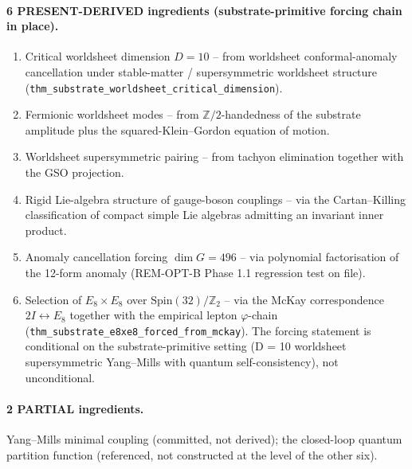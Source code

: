 ﻿\documentclass[reprint,amsmath,amssymb,aps,prd,longbibliography,floatfix]{revtex4-2}
\begin{document}
\paragraph{6 PRESENT-DERIVED ingredients (substrate-primitive forcing
chain in place).}
\begin{enumerate}
\item Critical worldsheet dimension $D = 10$ -- from worldsheet
conformal-anomaly cancellation under stable-matter / supersymmetric
worldsheet structure
(\texttt{thm\_substrate\_worldsheet\_critical\_dimension}).
\item Fermionic worldsheet modes -- from $\mathbb{Z}/2$-handedness
of the substrate amplitude plus the squared-Klein--Gordon equation
of motion.
\item Worldsheet supersymmetric pairing -- from tachyon elimination
together with the GSO projection.
\item Rigid Lie-algebra structure of gauge-boson couplings -- via the
Cartan--Killing classification of compact simple Lie algebras
admitting an invariant inner product.
\item[\hspace{0pt}\textbf{7.}] Anomaly cancellation forcing
$\dim G = 496$ -- via polynomial factorisation of the 12-form anomaly
(REM-OPT-B Phase 1.1 regression test on file).
\item[\hspace{0pt}\textbf{10.}] Selection of $E_8 \times E_8$ over
$\mathrm{Spin}(32)/\mathbb{Z}_2$ -- via the McKay correspondence
$2I \leftrightarrow E_8$ together with the empirical lepton
$\varphi$-chain
(\texttt{thm\_substrate\_e8xe8\_forced\_from\_mckay}). The forcing
statement is conditional on the substrate-primitive setting (D = 10
worldsheet supersymmetric Yang--Mills with quantum self-consistency),
not unconditional.
\end{enumerate}

\paragraph{2 PARTIAL ingredients.} Yang--Mills minimal coupling
(committed, not derived); the closed-loop quantum partition function
(referenced, not constructed at the level of the other six).
\end{document}
